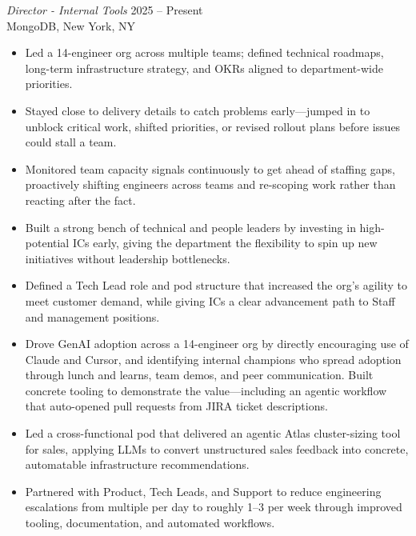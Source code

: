 \documentclass{res} %
\begin{document}
\begin{resume}
{\sl Director - Internal Tools} \hfill 2025 -- Present \\
MongoDB, New York, NY
\begin{itemize}
\item[-] Led a 14-engineer org across multiple teams; defined technical roadmaps, long-term infrastructure strategy, and OKRs aligned to department-wide priorities.
\item[-] Stayed close to delivery details to catch problems early---jumped in to unblock critical work, shifted priorities, or revised rollout plans before issues could stall a team.
\item[-] Monitored team capacity signals continuously to get ahead of staffing gaps, proactively shifting engineers across teams and re-scoping work rather than reacting after the fact.
\item[-] Built a strong bench of technical and people leaders by investing in high-potential ICs early, giving the department the flexibility to spin up new initiatives without leadership bottlenecks.
\item[-] Defined a Tech Lead role and pod structure that increased the org's agility to meet customer demand, while giving ICs a clear advancement path to Staff and management positions.
\item[-] Drove GenAI adoption across a 14-engineer org by directly encouraging use of Claude and Cursor, and identifying internal champions who spread adoption through lunch and learns, team demos, and peer communication. Built concrete tooling to demonstrate the value---including an agentic workflow that auto-opened pull requests from JIRA ticket descriptions.
\item[-] Led a cross-functional pod that delivered an agentic Atlas cluster-sizing tool for sales, applying LLMs to convert unstructured sales feedback into concrete, automatable infrastructure recommendations.
\item[-] Partnered with Product, Tech Leads, and Support to reduce engineering escalations from multiple per day to roughly 1--3 per week through improved tooling, documentation, and automated workflows.
\end{itemize}


\end{resume}
\end{document}
